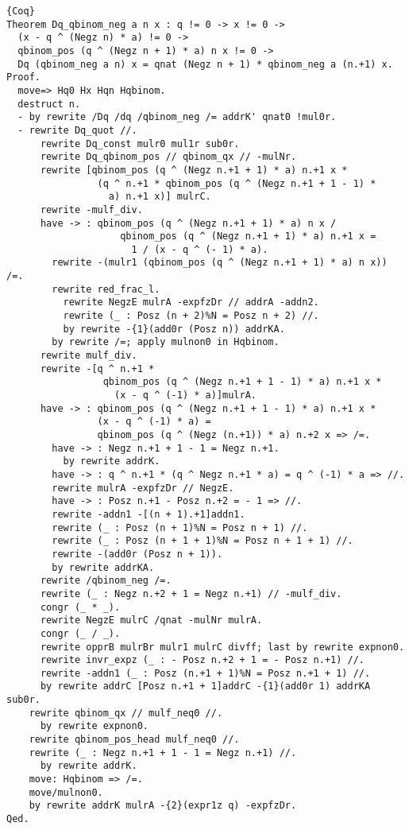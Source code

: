 \documentclass[11pt]{jarticle}
\theoremstyle{mystyle}
\newcommand{\0}{\textbf{0}}
\newcommand{\1}{\textbf{1}}
\newcommand{\2}{\textbf{2}}
\begin{document}
\begin{lstlisting}{Coq}
Theorem Dq_qbinom_neg a n x : q != 0 -> x != 0 ->
  (x - q ^ (Negz n) * a) != 0 ->
  qbinom_pos (q ^ (Negz n + 1) * a) n x != 0 ->
  Dq (qbinom_neg a n) x = qnat (Negz n + 1) * qbinom_neg a (n.+1) x.
Proof.
  move=> Hq0 Hx Hqn Hqbinom.
  destruct n.
  - by rewrite /Dq /dq /qbinom_neg /= addrK' qnat0 !mul0r.
  - rewrite Dq_quot //.
      rewrite Dq_const mulr0 mul1r sub0r.
      rewrite Dq_qbinom_pos // qbinom_qx // -mulNr.
      rewrite [qbinom_pos (q ^ (Negz n.+1 + 1) * a) n.+1 x *
                (q ^ n.+1 * qbinom_pos (q ^ (Negz n.+1 + 1 - 1) *
                  a) n.+1 x)] mulrC.
      rewrite -mulf_div.
      have -> : qbinom_pos (q ^ (Negz n.+1 + 1) * a) n x /
                    qbinom_pos (q ^ (Negz n.+1 + 1) * a) n.+1 x =
                      1 / (x - q ^ (- 1) * a).
        rewrite -(mulr1 (qbinom_pos (q ^ (Negz n.+1 + 1) * a) n x)) /=.
        rewrite red_frac_l.
          rewrite NegzE mulrA -expfzDr // addrA -addn2.
          rewrite (_ : Posz (n + 2)%N = Posz n + 2) //.
          by rewrite -{1}(add0r (Posz n)) addrKA.
        by rewrite /=; apply mulnon0 in Hqbinom.
      rewrite mulf_div.
      rewrite -[q ^ n.+1 *
                 qbinom_pos (q ^ (Negz n.+1 + 1 - 1) * a) n.+1 x *
                   (x - q ^ (-1) * a)]mulrA.
      have -> : qbinom_pos (q ^ (Negz n.+1 + 1 - 1) * a) n.+1 x *
                (x - q ^ (-1) * a) =
                qbinom_pos (q ^ (Negz (n.+1)) * a) n.+2 x => /=.
        have -> : Negz n.+1 + 1 - 1 = Negz n.+1.
          by rewrite addrK.
        have -> : q ^ n.+1 * (q ^ Negz n.+1 * a) = q ^ (-1) * a => //.
        rewrite mulrA -expfzDr // NegzE.
        have -> : Posz n.+1 - Posz n.+2 = - 1 => //.
        rewrite -addn1 -[(n + 1).+1]addn1.
        rewrite (_ : Posz (n + 1)%N = Posz n + 1) //.
        rewrite (_ : Posz (n + 1 + 1)%N = Posz n + 1 + 1) //.
        rewrite -(add0r (Posz n + 1)).
        by rewrite addrKA.
      rewrite /qbinom_neg /=.
      rewrite (_ : Negz n.+2 + 1 = Negz n.+1) // -mulf_div.
      congr (_ * _).
      rewrite NegzE mulrC /qnat -mulNr mulrA.
      congr (_ / _).
      rewrite opprB mulrBr mulr1 mulrC divff; last by rewrite expnon0.
      rewrite invr_expz (_ : - Posz n.+2 + 1 = - Posz n.+1) //.
      rewrite -addn1 (_ : Posz (n.+1 + 1)%N = Posz n.+1 + 1) //.
      by rewrite addrC [Posz n.+1 + 1]addrC -{1}(add0r 1) addrKA sub0r.
    rewrite qbinom_qx // mulf_neq0 //.
      by rewrite expnon0.
    rewrite qbinom_pos_head mulf_neq0 //.
    rewrite (_ : Negz n.+1 + 1 - 1 = Negz n.+1) //.
      by rewrite addrK.
    move: Hqbinom => /=.
    move/mulnon0.
    by rewrite addrK mulrA -{2}(expr1z q) -expfzDr.
Qed.\end{lstlisting}
\end{document}

